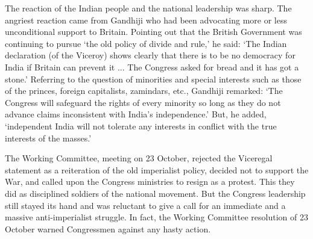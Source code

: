 \begin{multicols}{2}
The reaction of the Indian people and the national leadership was sharp. The angriest reaction came from Gandhiji who had been advocating more or less unconditional support to Britain. Pointing out that the British Government was continuing to pursue `the old policy of divide and rule,' he said: `The Indian declaration (of the Viceroy) shows clearly that there is to be no democracy for India if Britain can prevent it ... The Congress asked for bread and it has got a stone.' Referring to the question of minorities and special interests such as those of the princes, foreign capitalists, zamindars, etc., Gandhiji remarked: `The Congress will safeguard the rights of every minority so long as they do not advance claims inconsistent with India's independence.' But, he added, `independent India will not tolerate any interests in conflict with the true interests of the masses.' 

The Working Committee, meeting on 23 October, rejected the Viceregal statement as a reiteration of the old imperialist policy, decided not to support the War, and called upon the Congress ministries to resign as a protest. This they did as disciplined soldiers of the national movement. But the Congress leadership still stayed its hand and was reluctant to give a call for an immediate and a massive anti-imperialist struggle. In fact, the Working Committee resolution of 23 October warned Congressmen against any hasty action. 


\end{multicols}
